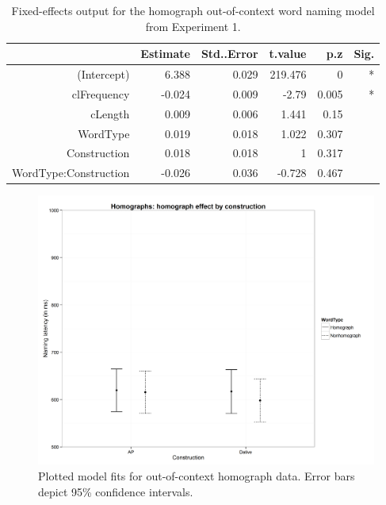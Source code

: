\begin{table}[htbp]
  \centering
  \caption{Fixed-effects output for the homograph out-of-context word naming model from Experiment 1.}
    \begin{tabular}{rrrrrr}
    \toprule
          & Estimate & Std..Error & t.value & p.z   & Sig. \\
    \midrule
    (Intercept) & 6.388 & 0.029 & 219.476 & 0     & * \\
    clFrequency & -0.024 & 0.009 & -2.79 & 0.005 & * \\
    cLength & 0.009 & 0.006 & 1.441 & 0.15  &  \\
    WordType & 0.019 & 0.018 & 1.022 & 0.307 &  \\
    Construction & 0.018 & 0.018 & 1     & 0.317 &  \\
    WordType:Construction & -0.026 & 0.036 & -0.728 & 0.467 &  \\
    \bottomrule
    \end{tabular}%
  \label{tab:ocon.bil.hom}%
\end{table}%

\begin{figure}[htbp]
\centering
\includegraphics[width=\textwidth,height=\textheight,keepaspectratio]{conXwordtype-homs.png}
\caption{Plotted model fits for out-of-context homograph data. Error bars depict 95\% confidence intervals.}
\label{fig:ooc.conXwordtype-homs}
\end{figure}


